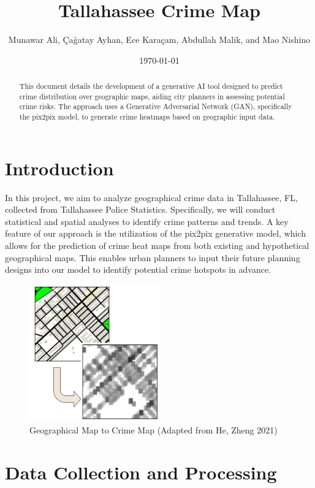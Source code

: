\documentclass{article}
\title{Tallahassee Crime Map}
\author{Munawar Ali, Çağatay Ayhan, Ece Karaçam, Abdullah Malik, and Mao Nishino}
\date{\today}
\begin{document}
\maketitle

\begin{abstract}
    This document details the development of a generative AI tool designed to predict crime distribution over geographic maps, aiding city planners in assessing potential crime risks. The approach uses a Generative Adversarial Network (GAN), specifically the pix2pix model, to generate crime heatmaps based on geographic input data.
\end{abstract}

\section{Introduction}

In this project, we aim to analyze geographical crime data in Tallahassee, FL, collected from Tallahassee Police Statistics. Specifically, we will conduct statistical and spatial analyses to identify crime patterns and trends. A key feature of our approach is the utilization of the pix2pix generative model, which allows for the prediction of crime heat maps from both existing and hypothetical geographical maps. This enables urban planners to input their future planning designs into our model to identify potential crime hotspots in advance.

\begin{figure}[!htbp]
    \centering
    \includegraphics[width=0.5\textwidth]{Figures/Intro Figure.png}
    \caption{Geographical Map to Crime Map (Adapted from He, Zheng 2021)}
\end{figure}

\section{Data Collection and Processing}
\end{document}
